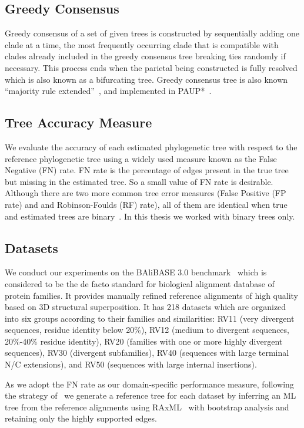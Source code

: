 \subsection{Greedy Consensus}

Greedy consensus of a set of given trees is constructed by sequentially
adding one clade at a time, the most frequently occurring clade that is compatible with clades already included
in the greedy consensus tree breaking ties randomly if necessary.
This process
ends when the parietal being constructed is fully resolved which is also known as a bifurcating tree. 
Greedy consensus tree is also known ``majority rule extended''~\cite{phylip}, and  implemented in PAUP*~\cite{swofford_paup*_2002}. 

\subsection{Tree Accuracy Measure} 
We evaluate the accuracy of each estimated phylogenetic tree with respect to the reference phylogenetic tree using a widely used measure known as the False Negative (FN) rate. FN rate is the percentage of edges present in the true tree but missing in the estimated tree. So a small value of FN rate is desirable. Although there are two more common tree error measures (False Positive (FP rate) and and Robinson-Foulds (RF) rate), all of them are identical when true and estimated trees are binary~\citep{warnow2017computational}. In this thesis we worked with binary trees only. %

\subsection{Datasets}
We conduct our experiments on the BAliBASE 3.0 benchmark~\cite{thompson2005balibase} which is considered to be the de facto standard for biological alignment database of protein families. It provides manually refined reference alignments of high quality based on 3D structural superposition. It has 218 datasets which are organized into six groups according to their families and similarities: RV11 (very divergent sequences, residue identity below 20\%), RV12 (medium to divergent sequences, 20\%-40\% residue identity), RV20 (families with one or more highly divergent sequences), RV30 (divergent subfamilies), RV40 (sequences with large terminal N/C extensions), and RV50 (sequences with large internal insertions). 

As we adopt the FN rate as our domain-specific performance measure, following the strategy of~\cite{mirarab2015pasta} we generate a reference tree for each dataset by inferring an ML tree from the reference alignments using RAxML~\cite{stamatakis2014raxml} with bootstrap analysis and retaining only the highly supported edges.



